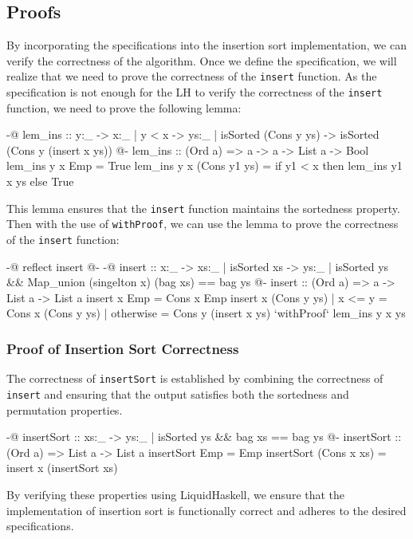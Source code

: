 \documentclass[]{rptuseminar}
\begin{document}
\subsection{Proofs}
By incorporating the specifications into the insertion sort implementation, we can verify the correctness of the algorithm.
Once we define the specification, we will realize that we need to prove the correctness of the \texttt{insert} function.
As the specification is not enough for the LH to verify the correctness of the \texttt{insert} function, we need to prove the following lemma:

\begin{haskell}
{-@ lem_ins :: y:_ -> {x:_ | y < x} -> {ys:_ | isSorted (Cons y ys)} 
    -> {isSorted (Cons y (insert x ys))} @-}
lem_ins :: (Ord a) => a -> a -> List a -> Bool
lem_ins y x Emp = True
lem_ins y x (Cons y1 ys) = if y1 < x then lem_ins y1 x ys else True
\end{haskell}

This lemma ensures that the \texttt{insert} function maintains the sortedness property.
Then with the use of \texttt{withProof}, we can use the lemma to prove the correctness of the \texttt{insert} function:

\begin{haskell}
{-@ reflect insert @-}
{-@ insert :: x:_ -> {xs:_ | isSorted xs} 
  -> {ys:_ | isSorted ys && Map_union (singelton x) (bag xs) == bag ys  } @-}
insert :: (Ord a) => a -> List a -> List a
insert x Emp = Cons x Emp
insert x (Cons y ys)
  | x <= y = Cons x (Cons y ys)
  | otherwise = Cons y (insert x ys) `withProof` lem_ins y x ys
\end{haskell}

\subsubsection{Proof of Insertion Sort Correctness}

The correctness of \texttt{insertSort} is established by combining the correctness of \texttt{insert} and ensuring that the output satisfies 
both the sortedness and permutation properties.

\begin{haskell}
{-@ insertSort :: xs:_ -> {ys:_ | isSorted ys && bag xs == bag ys} @-}
insertSort :: (Ord a) => List a -> List a
insertSort Emp = Emp
insertSort (Cons x xs) = insert x (insertSort xs)
\end{haskell}

By verifying these properties using LiquidHaskell, we ensure that the implementation of insertion sort is functionally correct and adheres to the desired specifications.
\end{document}
